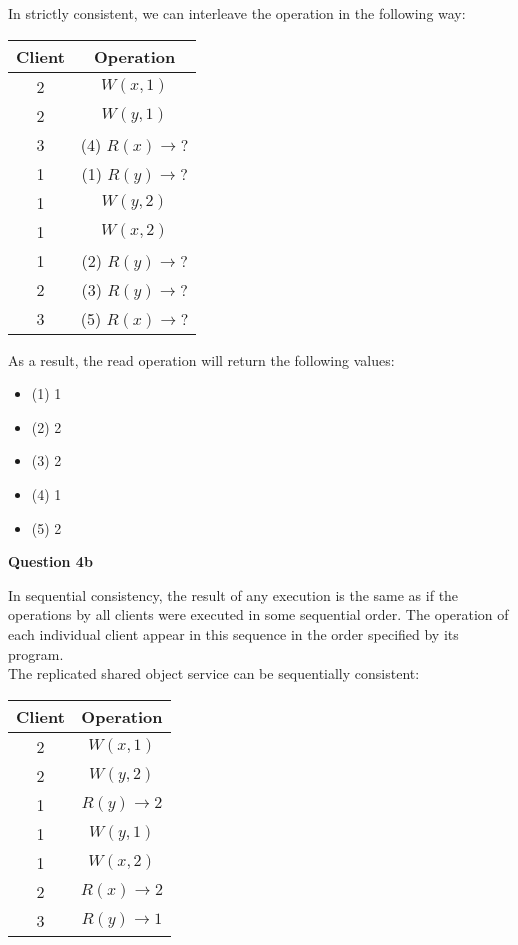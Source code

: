 \documentclass[11pt,a4paper]{report}
\begin{document}
\begin{multicols*}{2}
\noindent In strictly consistent, we can interleave the operation in the following way:

\begin{center}
\begin{tabular}{|c|c|}
  \hline
  Client & Operation \\
  \hline
  2      & $W(x,1)$ \\
  2      & $W(y,1)$ \\
  3      & (4) $R(x)\rightarrow ?$ \\
  1      & (1) $R(y)\rightarrow ?$ \\
  1      & $W(y,2)$ \\
  1      & $W(x,2)$ \\
  1      & (2) $R(y)\rightarrow ?$ \\
  2      & (3) $R(y)\rightarrow ?$ \\
  3      & (5) $R(x)\rightarrow ?$ \\
  \hline
\end{tabular}
\end{center}

\noindent As a result, the read operation will return the following values:
\begin{itemize}
  \item (1) 1
  \item (2) 2
  \item (3) 2
  \item (4) 1
  \item (5) 2
\end{itemize}

\noindent \textbf{Question 4b}

\noindent In sequential consistency, the result of any execution is the same as if the operations by all clients were executed in some sequential order. The operation of each individual client appear in this sequence in the order specified by its program. \\

\noindent The replicated shared object service can be sequentially consistent:

\begin{center}
\begin{tabular}{|c|c|}
  \hline
  Client & Operation \\
  \hline
  2      & $W(x,1)$ \\
  2      & $W(y,2)$ \\
  1      & $R(y)\rightarrow 2$ \\
  1      & $W(y,1)$ \\
  1      & $W(x,2)$ \\
  2      & $R(x)\rightarrow 2$ \\
  3      & $R(y)\rightarrow 1$ \\
  \hline
\end{tabular}
\end{center}


\end{multicols*}
\end{document}

